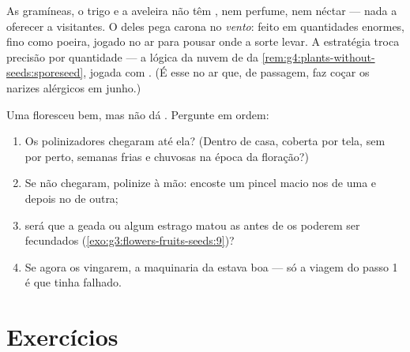 \begin{example}\label{ex:g5:flower-to-fruit:wind}
As gramíneas, o trigo e a aveleira não têm , nem perfume, nem
néctar --- nada a oferecer a visitantes. O  deles pega carona no
\emph{vento}: feito em quantidades enormes, fino como poeira, jogado
no ar para pousar onde a sorte levar. A estratégia troca precisão
por quantidade --- a lógica da nuvem de  da
\cref{rem:g4:plants-without-seeds:sporeseed}, jogada com . (É
esse  no ar que, de passagem, faz coçar os narizes alérgicos em
junho.)
\end{example}

\begin{method}\label{met:g5:flower-to-fruit:diagnose}
Uma  floresceu bem, mas não dá . Pergunte em ordem:
\begin{enumerate}
  \item Os polinizadores chegaram até ela? (Dentro de casa,
        coberta por tela, sem  por perto, semanas frias e
        chuvosas na época da floração?)
  \item Se não chegaram, polinize à mão: encoste um pincel macio nos
         de uma  e depois no  de outra;
  \item será que a geada ou algum estrago matou as  antes de
        os  poderem ser fecundados
        (\cref{exo:g3:flowers-fruits-seeds:9})?
  \item Se agora os  vingarem, a maquinaria da  estava
        boa --- só a viagem do passo 1 é que tinha falhado.
\end{enumerate}
\end{method}

\section{Exercícios}

